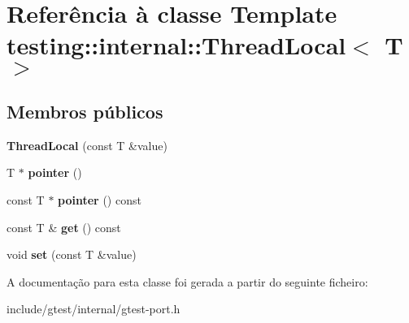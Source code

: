 \hypertarget{classtesting_1_1internal_1_1ThreadLocal}{\section{Referência à classe Template testing\-:\-:internal\-:\-:Thread\-Local$<$ T $>$}
\label{classtesting_1_1internal_1_1ThreadLocal}
}
\subsection*{Membros públicos}
\begin{DoxyCompactItemize}
\item 
\hypertarget{classtesting_1_1internal_1_1ThreadLocal_a85610bdfdbc93a4c56215e0aad7da870}{{\bfseries Thread\-Local} (const T \&value)}\label{classtesting_1_1internal_1_1ThreadLocal_a85610bdfdbc93a4c56215e0aad7da870}

\item 
\hypertarget{classtesting_1_1internal_1_1ThreadLocal_a882f57fed4b074de83693c0c0fe62858}{T $\ast$ {\bfseries pointer} ()}\label{classtesting_1_1internal_1_1ThreadLocal_a882f57fed4b074de83693c0c0fe62858}

\item 
\hypertarget{classtesting_1_1internal_1_1ThreadLocal_af4b33c12fd2da7d43d8654feccca77f7}{const T $\ast$ {\bfseries pointer} () const }\label{classtesting_1_1internal_1_1ThreadLocal_af4b33c12fd2da7d43d8654feccca77f7}

\item 
\hypertarget{classtesting_1_1internal_1_1ThreadLocal_a9cfa47ae6e9e8c19fe8782e2e9c1b13e}{const T \& {\bfseries get} () const }\label{classtesting_1_1internal_1_1ThreadLocal_a9cfa47ae6e9e8c19fe8782e2e9c1b13e}

\item 
\hypertarget{classtesting_1_1internal_1_1ThreadLocal_ab5ebc7ba07426cef7167afa2a7707eb4}{void {\bfseries set} (const T \&value)}\label{classtesting_1_1internal_1_1ThreadLocal_ab5ebc7ba07426cef7167afa2a7707eb4}

\end{DoxyCompactItemize}


A documentação para esta classe foi gerada a partir do seguinte ficheiro\-:\begin{DoxyCompactItemize}
\item 
include/gtest/internal/gtest-\/port.\-h\end{DoxyCompactItemize}
